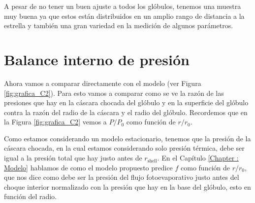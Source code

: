 \documentclass{book}
\begin{document}
A pesar de no tener un buen ajuste a todos los glóbulos, tenemos una muestra muy buena ya que estos están distribuidos en un amplio rango de distancia a la estrella y también una gran variedad en la medición de algunos parámetros. 



\section{Balance interno de presión}\label{Sec : comparacion-modelo}

Ahora vamos a comparar directamente con el modelo (ver Figura \ref{fig:grafica_C2}). Para esto vamos a comparar como se ve la razón de las presiones que hay en la cáscara chocada del glóbulo y en la superficie del glóbulo contra la razón del radio de la cáscara y el radio del glóbulo. Recordemos que en la Figura \ref{fig:grafica_C2} vemos a $P/P_0$ como función de $r/r_0$.

Como estamos considerando un modelo estacionario, tenemos que la presión de la cáscara chocada, en la cual estamos considerando solo presión térmica, debe ser igual a la presión total que hay justo antes de $r_\mathrm{shell}$. En el Capítulo \ref{Chapter : Modelo} hablamos de como el modelo propuesto predice $f$ como función de $r/r_0$, que nos dice como debe ser la presión del flujo fotoevaporativo justo antes del choque interior normalizado con la presión que hay en la base del glóbulo, esto en función del radio.  
\end{document}
